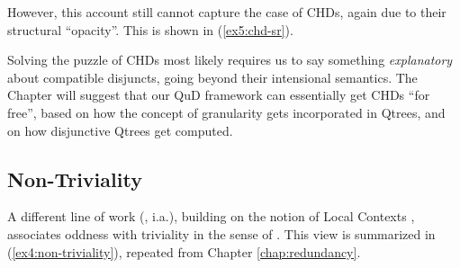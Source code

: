 However, this account still cannot capture the case of CHDs, again due to their structural ``opacity''. This is shown in (\ref{ex5:chd-sr}).

\begin{exe}
		\label{ex5:chd-sr}
\end{exe}

Solving the puzzle of CHDs most likely requires us to say something \textit{explanatory} about compatible disjuncts, going beyond their intensional semantics. The Chapter will suggest that our QuD framework can essentially get CHDs ``for free'', based on how the concept of granularity gets incorporated in Qtrees, and on how disjunctive Qtrees get computed.


\subsection{Non-Triviality}\label{sec5:non-triviality}
A different line of work (\citeauthor{Mayr2016}, \citeyear{Mayr2016} i.a.), building on the notion of Local Contexts \parencite{Schlenker2009}, associates oddness with triviality in the sense of \parencite{Stalnaker1999}. This view is summarized in (\ref{ex4:non-triviality}), repeated from Chapter \ref{chap:redundancy}.


